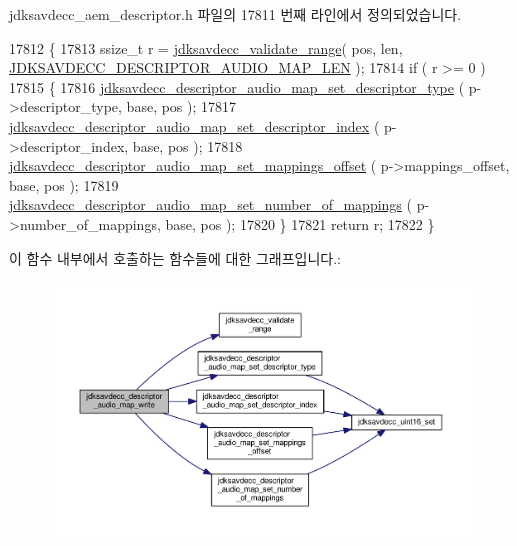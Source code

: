 jdksavdecc\+\_\+aem\+\_\+descriptor.\+h 파일의 17811 번째 라인에서 정의되었습니다.


\begin{DoxyCode}
17812 \{
17813     ssize\_t r = \hyperlink{group__util_ga9c02bdfe76c69163647c3196db7a73a1}{jdksavdecc\_validate\_range}( pos, len, 
      \hyperlink{group__descriptor__audio__map_gaf25e1ca640ec4fced1a131446d24dd9f}{JDKSAVDECC\_DESCRIPTOR\_AUDIO\_MAP\_LEN} );
17814     \textcolor{keywordflow}{if} ( r >= 0 )
17815     \{
17816         \hyperlink{group__descriptor__audio__map_gab7dfc463aff46348d705a4d831ca36d0}{jdksavdecc\_descriptor\_audio\_map\_set\_descriptor\_type}
      ( p->descriptor\_type, base, pos );
17817         \hyperlink{group__descriptor__audio__map_gaa3a839e21398345dd1797f66e148fbdd}{jdksavdecc\_descriptor\_audio\_map\_set\_descriptor\_index}
      ( p->descriptor\_index, base, pos );
17818         \hyperlink{group__descriptor__audio__map_ga60e089dae6760e0a6eba4ec42db5b50d}{jdksavdecc\_descriptor\_audio\_map\_set\_mappings\_offset}
      ( p->mappings\_offset, base, pos );
17819         \hyperlink{group__descriptor__audio__map_ga19f42555dc877c8c0286d7d0b26f932a}{jdksavdecc\_descriptor\_audio\_map\_set\_number\_of\_mappings}
      ( p->number\_of\_mappings, base, pos );
17820     \}
17821     \textcolor{keywordflow}{return} r;
17822 \}
\end{DoxyCode}


이 함수 내부에서 호출하는 함수들에 대한 그래프입니다.\+:
\nopagebreak
\begin{figure}[H]
\begin{center}
\leavevmode
\includegraphics[width=350pt]{group__descriptor__audio__map_gacb4e95fe8ccec543e7af88f2f450dff0_cgraph}
\end{center}
\end{figure}


